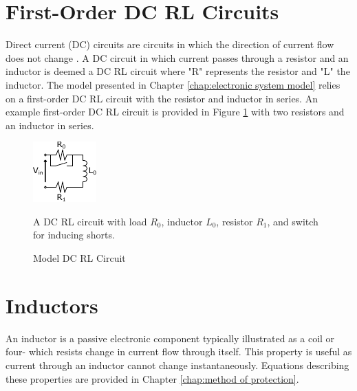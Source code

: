 \documentclass[11pt,oneside]{report}
\begin{document}
    \section{First-Order DC RL Circuits}
    Direct current (DC) circuits are circuits in which the direction of current flow does not change \cite{uniphy}. A DC circuit in which current passes through a resistor and an inductor is deemed a DC RL circuit where "R" represents the resistor and "L" the inductor. The model presented in Chapter \ref{chap:electronic system model} relies on a first-order DC RL circuit with the resistor and inductor in series. An example first-order DC RL circuit is provided in Figure \ref{fig:ModelDCRL} with two resistors and an inductor in series.
    \begin{figure}
        \centering
        \includegraphics[width=0.25\linewidth]{img/Model_DC_RL_Circuit_General.pdf}
        \caption{Model DC RL Circuit} A DC RL circuit with load $R_0$, inductor $L_0$, resistor $R_1$, and switch for inducing shorts.
        \label{fig:ModelDCRL}
    \end{figure}
    \section{Inductors}
    An inductor is a passive electronic component typically illustrated as a coil or four- which resists change in current flow through itself. This property is useful as current through an inductor cannot change instantaneously. Equations describing these properties are provided in Chapter \ref{chap:method of protection}.
\end{document}

